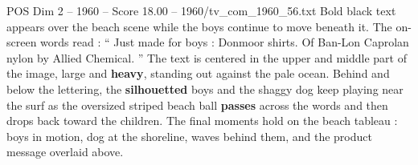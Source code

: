 \begin{textsample}{POS Dim 2 – 1960 – Score 18.00 – 1960/tv\_com\_1960\_56.txt}
Bold black text appears over the beach scene while the boys continue to move beneath it.
The on-screen words read : “ Just made for boys : Donmoor shirts.
Of Ban-Lon Caprolan nylon by Allied Chemical. ” The text is centered in the upper and middle part of the image, large and \textbf{heavy}, standing out against the pale ocean.
Behind and below the lettering, the \textbf{silhouetted} boys and the shaggy dog keep playing near the surf as the oversized striped beach ball \textbf{passes} across the words and then drops back toward the children.
The final moments hold on the beach tableau : boys in motion, dog at the shoreline, waves behind them, and the product message overlaid above.

\end{textsample}

